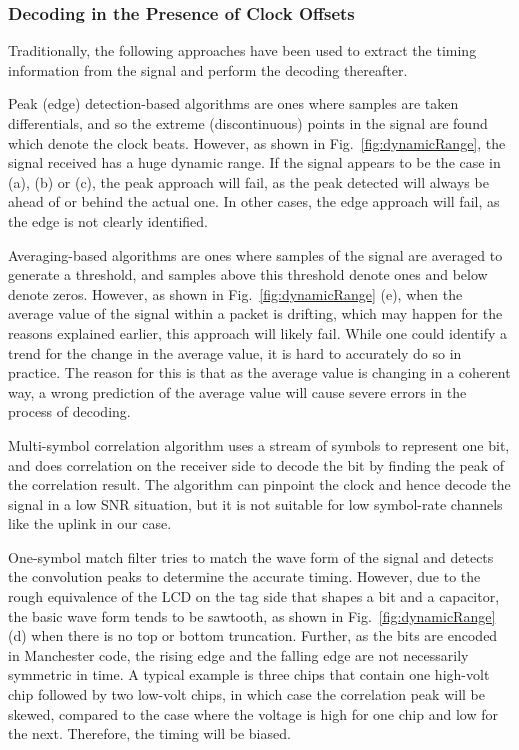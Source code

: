 \subsubsection{Decoding in the Presence of Clock Offsets}
\label{subsubsec:clockoffset}
Traditionally, the following approaches have been used to extract the timing information from the signal and perform the decoding thereafter.
\begin{Itemize}
\item Peak (edge) detection-based algorithms are ones where samples are taken differentials, and so the extreme (discontinuous) points in the signal are found which denote the clock beats. However, as shown in Fig.~\ref{fig:dynamicRange}, the signal received has a huge dynamic range. If the signal appears to be the case in (a), (b) or (c), the peak approach will fail, as the peak detected will always be ahead of or behind the actual one. In other cases, the edge approach will fail, as the edge is not clearly identified. 
\item Averaging-based algorithms are ones where samples of the signal are averaged to generate a threshold, and samples above this threshold denote ones and below denote zeros. However, as shown in Fig.~\ref{fig:dynamicRange} (e), when the average value of the signal within a packet is drifting, which may happen for the reasons explained earlier, this approach will likely fail. While one could identify a trend for the change in the average value, it is hard to accurately do so in practice. The reason for this is that as the average value is changing in a coherent way, a wrong prediction of the average value will cause severe errors in the process of decoding.
\item Multi-symbol correlation algorithm uses a stream of symbols to represent one bit, and does correlation on the receiver side to decode the bit by finding the peak of the correlation result. The algorithm can pinpoint the clock and hence decode the signal in a low SNR situation, but it is not suitable for low symbol-rate channels like the uplink in our case. 
\item One-symbol match filter tries to match the wave form of the signal and detects the convolution peaks to determine the accurate timing. However, due to the rough equivalence of the LCD on the tag side that shapes a bit and a capacitor, the basic wave form tends to be sawtooth, as shown in Fig.~\ref{fig:dynamicRange} (d) when there is no top or bottom truncation. Further, as the bits are encoded in Manchester code, the rising edge and the falling edge are not necessarily symmetric in time. A typical example is three chips that contain one high-volt chip followed by two low-volt chips, in which case the correlation peak will be skewed, compared to the case where the voltage is high for one chip and low for the next. Therefore, the timing will be biased.
\end{Itemize}

